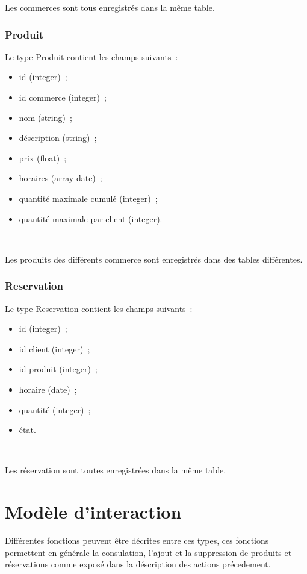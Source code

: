 \documentclass[a4paper,12pt]{article}
\begin{document}
Les commerces sont tous enregistrés dans la même table.

\subsubsection{Produit}

Le type Produit contient les champs suivants~:
\begin{itemize}
	\item id (integer)~;
	\item id commerce (integer)~;
	\item nom (string)~;
	\item déscription (string)~;
	\item prix (float)~;
	\item horaires (array date)~;
	\item quantité maximale cumulé (integer)~;
	\item quantité maximale par client (integer).
\end{itemize} \

Les produits des différents commerce sont enregistrés dans des tables différentes.

\subsubsection{Reservation}

Le type Reservation contient les champs suivants~:
\begin{itemize}
	\item id (integer)~;
	\item id client (integer)~;
	\item id produit (integer)~;
	\item horaire (date)~;
	\item quantité (integer)~;
	\item état.
\end{itemize} \

Les réservation sont toutes enregistrées dans la même table.

\section{Modèle d'interaction}

Différentes fonctions peuvent être décrites entre ces types, ces fonctions permettent en générale la consulation, l'ajout et la suppression de produits et réservations comme exposé dans la déscription des actions précedement.
\end{document}

